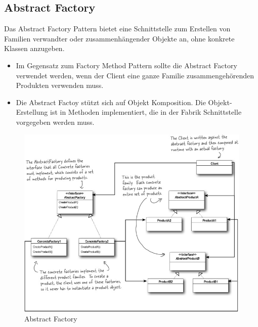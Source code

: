 \subsection{Abstract Factory}
\label{sec:abstractfactory}
Das Abstract Factory Pattern bietet eine Schnittstelle zum Erstellen von Familien verwandter oder zusammenhängender Objekte an, ohne konkrete Klassen anzugeben.
\begin{itemize}
	\item Im Gegensatz zum Factory Method Pattern sollte die Abstract Factory verwendet werden, wenn der Client eine ganze Familie zusammengehörenden Produkten verwenden muss.
	\item Die Abstract Factoy stützt sich auf Objekt Komposition. Die Objekt-Erstellung ist in Methoden implementiert, die in der Fabrik Schnittstelle vorgegeben werden muss.
\end{itemize}

\begin{figure}[h]
\centering
\includegraphics[width=0.7\linewidth]{images/abstract_factory_pattern}
\caption{Abstract Factory}
\label{fig:abstractfactorypattern}
\end{figure}

\newpage


